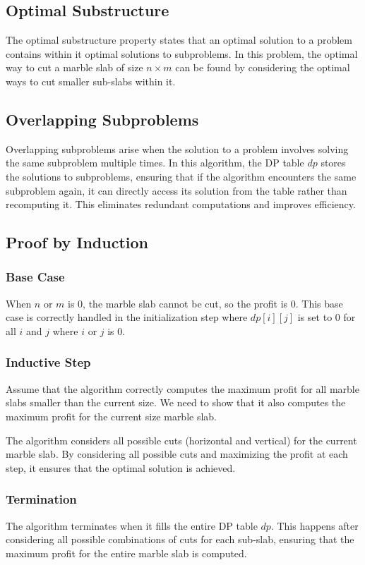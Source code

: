 \documentclass{article}
\begin{document}
{\subsection*{Optimal Substructure}
The optimal substructure property states that an optimal solution to a problem contains within it optimal solutions to subproblems. In this problem, the optimal way to cut a marble slab of size $n \times m$ can be found by considering the optimal ways to cut smaller sub-slabs within it.

\subsection*{Overlapping Subproblems}
Overlapping subproblems arise when the solution to a problem involves solving the same subproblem multiple times. In this algorithm, the DP table $dp$ stores the solutions to subproblems, ensuring that if the algorithm encounters the same subproblem again, it can directly access its solution from the table rather than recomputing it. This eliminates redundant computations and improves efficiency.

\subsection*{Proof by Induction}
\subsubsection*{Base Case} 
When $n$ or $m$ is 0, the marble slab cannot be cut, so the profit is 0. This base case is correctly handled in the initialization step where $dp[i][j]$ is set to 0 for all $i$ and $j$ where $i$ or $j$ is 0.

\subsubsection*{Inductive Step}
Assume that the algorithm correctly computes the maximum profit for all marble slabs smaller than the current size. We need to show that it also computes the maximum profit for the current size marble slab.

The algorithm considers all possible cuts (horizontal and vertical) for the current marble slab. By considering all possible cuts and maximizing the profit at each step, it ensures that the optimal solution is achieved.

\subsubsection*{Termination}
The algorithm terminates when it fills the entire DP table $dp$. This happens after considering all possible combinations of cuts for each sub-slab, ensuring that the maximum profit for the entire marble slab is computed.

}
\end{document}
